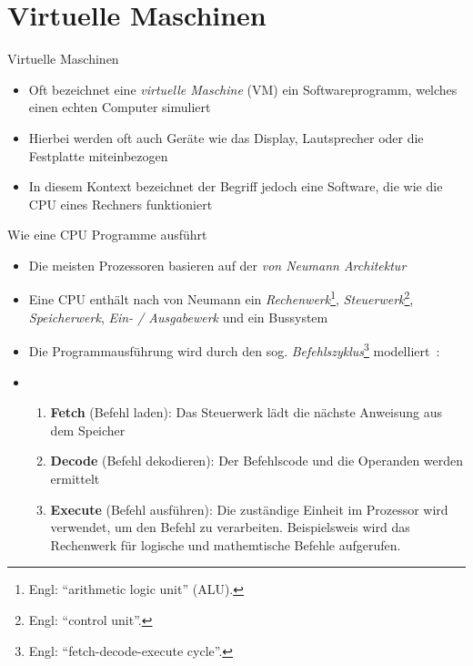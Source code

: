 \section{Virtuelle Maschinen}

\begin{frame}{Virtuelle Maschinen}
	\begin{itemize}
		\item Oft bezeichnet eine \emph{virtuelle Maschine} (VM) ein Softwareprogramm, welches einen echten Computer simuliert
		\item Hierbei werden oft auch Geräte wie das Display, Lautsprecher oder die Festplatte miteinbezogen
		\item In diesem Kontext bezeichnet der Begriff jedoch eine Software, die wie die CPU eines Rechners funktioniert
	\end{itemize}
\end{frame}

\begin{frame}{Wie eine CPU Programme ausführt}
	\begin{itemize}
		\item Die meisten Prozessoren basieren auf der \emph{von Neumann Architektur}~
		\item Eine CPU enthält nach von Neumann ein \emph{Rechenwerk}\footnote{Engl: \enquote{arithmetic logic unit} (ALU).}, \emph{Steuerwerk}\footnote{Engl: \enquote{control unit}.}, \emph{Speicherwerk}, \emph{Ein- / Ausgabewerk} und ein Bussystem~
		\item Die Programmausführung wird durch den sog. \emph{Befehlszyklus}\footnote{Engl: \enquote{fetch-decode-execute cycle}.} modelliert~:
		\item[] \begin{enumerate}
				\item \textbf{Fetch} (Befehl laden): Das Steuerwerk lädt die nächste Anweisung aus dem Speicher
				\item \textbf{Decode} (Befehl dekodieren): Der Befehlscode und die Operanden werden ermittelt
				\item \textbf{Execute} (Befehl ausführen): Die zuständige Einheit im Prozessor wird verwendet, um den Befehl zu verarbeiten.
				      Beispielsweis wird das Rechenwerk für logische und mathemtische Befehle aufgerufen.
			\end{enumerate}
	\end{itemize}
\end{frame}

